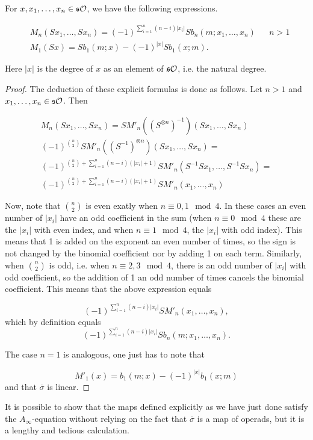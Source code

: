 \documentclass[join.tex]{subfiles}
\begin{document}
\begin{lem}\label{explicit}
For $x,x_1,\dots,x_n\in\mathfrak{s}{\mathcal O}$, we have the following expressions.

\begin{align*}
&M_n(Sx_1,\dots, Sx_n)=(-1)^{\sum_{i=1}^n(n-i)|x_i|}Sb_n(m;x_1,\dots, x_n) & & n>1\\
&M_1(Sx)=Sb_1(m;x)-(-1)^{|x|}Sb_1(x;m).
\end{align*}

Here $|x|$ is the degree of $x$ as an element of $\mathfrak{s}{\mathcal O}$, i.e. the natural degree. 
\end{lem}
\begin{proof}
The deduction of these explicit formulas is done as follows. Let $n>1$ and $x_1,\dots, x_n\in \mathfrak{s}{\mathcal O}$. Then

\begin{align*}
M_n(Sx_1,\dots, Sx_n)=SM'_n((S^{\otimes n})^{-1})(Sx_1,\dots, Sx_n)\\
(-1)^{\binom{n}{2}}SM'_n((S^{-1})^{\otimes n})(Sx_1,\dots, Sx_n)=\\
(-1)^{\binom{n}{2}+\sum_{i=1}^n(n-i)(|x_i|+1)}SM'_n(S^{-1}Sx_1,\dots, S^{-1}Sx_n)=\\
(-1)^{\binom{n}{2}+\sum_{i=1}^n(n-i)(|x_i|+1)}SM'_n(x_1,\dots,x_n)
\end{align*}

Now, note that $\binom{n}{2}$ is even exatly when $n\equiv 0,1\mod 4$. In these cases an even number of $|x_i|$ have an odd coefficient in the sum (when $n\equiv 0\mod 4$ these are the $|x_i|$ with even index, and when $n\equiv 1\mod 4$, the $|x_i|$ with odd index). This means that 1 is added on the exponent an even number of times, so the sign is not changed by the binomial coefficient nor by adding 1 on each term. Similarly, when $\binom{n}{2}$ is odd, i.e. when $n\equiv 2,3\mod 4$, there is an odd number of $|x_i|$ with odd coefficient, so the addition of 1 an odd number of times cancels the binomial coefficient. This means that the above expression equals

\[(-1)^{\sum_{i=1}^n(n-i)|x_i|}SM'_n(x_1,\dots,x_n),\]
which by definition equals
\[(-1)^{\sum_{i=1}^n(n-i)|x_i|}Sb_n(m;x_1,\dots,x_n).\]

The case $n=1$ is analogous, one just has to note that 

\[
M'_1(x)=b_1(m;x)-(-1)^{|x|}b_1(x;m)
\]
and that $\overline{\sigma}$ is linear. 
\end{proof}

It is possible to show that the maps defined explicitly as we have just done satisfy the $A_\infty$-equation without relying on the fact that $\overline{\sigma}$ is a map of operads, but it is a lengthy and tedious calculation.
\end{document}
